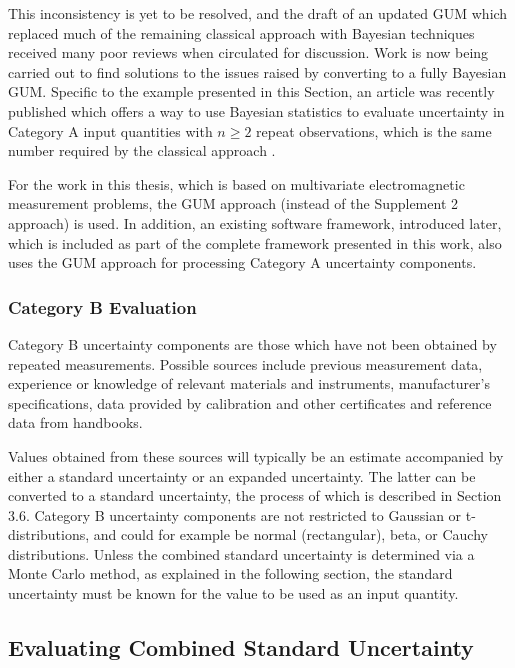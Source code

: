 \documentclass[../thesis/thesis.tex]{subfiles}
\begin{document}
\begin{refsection}
This inconsistency is yet to be resolved, and the draft of an updated GUM which replaced much of the remaining classical approach with Bayesian techniques received many poor reviews when circulated for discussion. Work is now being carried out to find solutions to the issues raised by converting to a fully Bayesian GUM. Specific to the example presented in this Section, an article was recently published which offers a way to use Bayesian statistics to evaluate uncertainty in Category A input quantities with $n \ge 2$ repeat observations, which is the same number required by the classical approach \cite{Cox_2017}.

For the work in this thesis, which is based on multivariate electromagnetic measurement problems, the GUM approach (instead of the Supplement 2 approach) is used. In addition, an existing software framework, introduced later, which is included as part of the complete framework presented in this work, also uses the GUM approach for processing Category A uncertainty components.

\subsubsection{Category B Evaluation}

Category B uncertainty components are those which have not been obtained by repeated measurements. Possible sources include previous measurement data, experience or knowledge of relevant materials and instruments, manufacturer’s specifications, data provided by calibration and other certificates and reference data from handbooks.

Values obtained from these sources will typically be an estimate accompanied by either a standard uncertainty or an expanded uncertainty. The latter can be converted to a standard uncertainty, the process of which is described in Section 3.6. Category B uncertainty components are not restricted to Gaussian or t-distributions, and could for example be normal (rectangular), beta, or Cauchy distributions. Unless the combined standard uncertainty is determined via a Monte Carlo method, as explained in the following section, the standard uncertainty must be known for the value to be used as an input quantity.

\subsection{Evaluating Combined Standard Uncertainty}


\end{refsection}
\end{document}
